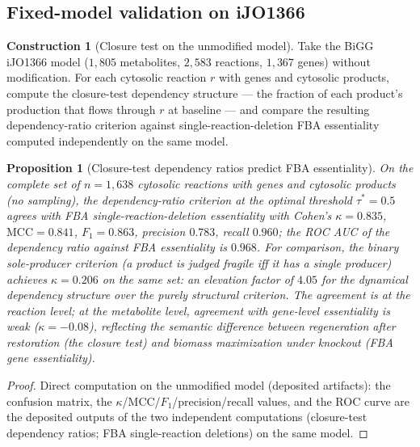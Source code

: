 \documentclass[11pt,a4paper]{article}
\theoremstyle{plain}
\newtheorem{proposition}[theorem]{Proposition}
\theoremstyle{definition}
\newtheorem{construction}[theorem]{Construction}
\theoremstyle{remark}
\begin{document}
\subsection{Fixed-model validation on iJO1366}
\label{sec:network-essentiality}

\begin{construction}[Closure test on the unmodified model]
\label{con:iJO1366-external-essentiality}
Take the BiGG iJO1366 model ($1{,}805$ metabolites, $2{,}583$
reactions, $1{,}367$ genes) without modification. For each
cytosolic reaction $r$ with genes and cytosolic products, compute
the closure-test dependency structure --- the fraction of each
product's production that flows through $r$ at baseline --- and
compare the resulting dependency-ratio criterion against
single-reaction-deletion FBA essentiality computed independently
on the same model.
\end{construction}

\begin{proposition}[Closure-test dependency ratios predict FBA
essentiality]\label{prop:iJO1366-external}
On the complete set of $n=1{,}638$ cytosolic reactions with genes
and cytosolic products (no sampling), the dependency-ratio
criterion at the optimal threshold $\tau^{*}=0.5$ agrees with FBA
single-reaction-deletion essentiality with Cohen's
$\kappa=0.835$, $\mathrm{MCC}=0.841$, $F_1=0.863$, precision
$0.783$, recall $0.960$; the ROC AUC of the dependency ratio
against FBA essentiality is $0.968$. For comparison, the binary
sole-producer criterion (a product is judged fragile iff it has a
single producer) achieves $\kappa=0.206$ on the same set: an
elevation factor of $4.05$ for the dynamical dependency
structure over the purely structural criterion. The agreement is
at the reaction level; at the metabolite level, agreement with
gene-level essentiality is weak ($\kappa=-0.08$), reflecting the
semantic difference between regeneration after restoration
(the closure test) and biomass maximization under knockout (FBA
gene essentiality).
\end{proposition}

\begin{proof}
Direct computation on the unmodified model (deposited artifacts):
the confusion matrix, the $\kappa$/MCC/$F_1$/precision/recall
values, and the ROC curve are the deposited outputs of the two
independent computations (closure-test dependency ratios; FBA
single-reaction deletions) on the same model.
\end{proof}
\end{document}
